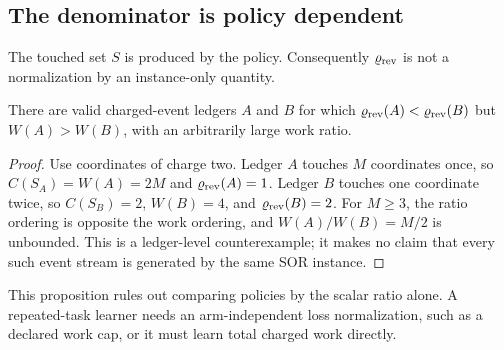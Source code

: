 \subsection{The denominator is policy dependent}

The touched set $S$ is produced by the policy.  Consequently
$\varrho_{\rm rev}$ is not a normalization by an instance-only quantity.

\begin{proposition}
\label{prop:not-order}
There are valid charged-event ledgers $A$ and $B$ for which
$\varrho_{\rm rev}(A)<\varrho_{\rm rev}(B)$ but $W(A)>W(B)$, with an
arbitrarily large work ratio.
\end{proposition}

\begin{proof}
Use coordinates of charge two.  Ledger $A$ touches $M$ coordinates once, so
$C(S_A)=W(A)=2M$ and $\varrho_{\rm rev}(A)=1$.  Ledger $B$ touches one
coordinate twice, so $C(S_B)=2$, $W(B)=4$, and
$\varrho_{\rm rev}(B)=2$.  For $M\geq3$, the ratio ordering is opposite the
work ordering, and $W(A)/W(B)=M/2$ is unbounded.  This is a ledger-level
counterexample; it makes no claim that every such event stream is generated
by the same SOR instance.
\end{proof}

This proposition rules out comparing policies by the scalar ratio alone.  A
repeated-task learner needs an arm-independent loss normalization, such as a
declared work cap, or it must learn total charged work directly.
